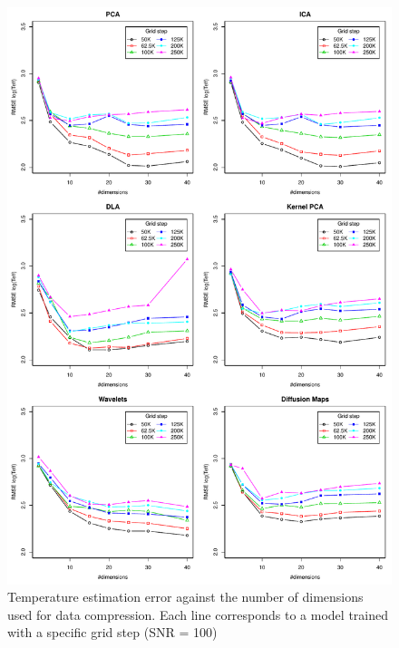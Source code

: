 \documentclass[a4paper,fleqn,usenatbib]{mnras}
\begin{document}
{{{\begin{figure}
\centering\includegraphics[height=0.95\textheight]{bestSVM_Teff_N-RMSE_HR10_snr=100_all.pdf}
\caption{Temperature estimation error against the number of dimensions
  used for data compression. Each line corresponds to a model trained
  with a specific grid step (SNR = 100)}
\label{fig:grid100}
\end{figure}

}}}
\end{document}
